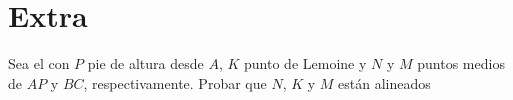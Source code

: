 \section{Extra}

\begin{section-problem}
    Sea el  con $P$ pie de altura desde $A$, $K$ punto de Lemoine y $N$ y $M$ puntos medios de $AP$ y $BC$, respectivamente.
    Probar que $N$, $K$ y $M$ están alineados
\end{section-problem}